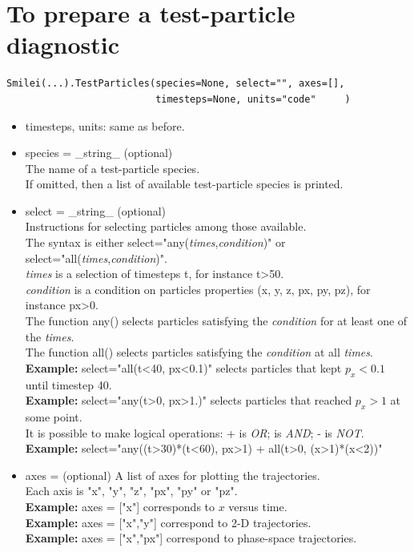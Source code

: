 \documentclass[11pt]{article}
\newcommand{\code}[1]{\colorbox{yellow!15}{\ttfamily #1}}
\newcommand{\val}[1]{{\ttfamily \textit{#1}}}
\begin{document}
\section{To prepare a test-particle diagnostic}

\begin{lstlisting}
Smilei(...).TestParticles(species=None, select="", axes=[],
                          timesteps=None, units="code"     )
\end{lstlisting}


\begin{itemize}
\item \code{timesteps}, \code{units}: same as before.
\item \code{species} = \code{\_string\_} (optional)\\
	The name of a test-particle species.\\
	If omitted, then a list of available test-particle species is printed.
\item \code{select} = \code{\_string\_} (optional)\\
	Instructions for selecting particles among those available.\\
	The syntax is either \code{select="any(\val{times},\val{condition})"}
	or \code{select="all(\val{times},\val{condition})"}.\\
	\val{times} is a selection of timesteps \code{t}, for instance \code{t>50}.\\
	\val{condition} is a condition on particles properties  (\code{x}, \code{y}, \code{z},
	\code{px}, \code{py}, \code{pz}), for instance \code{px>0}.\\
	The function \code{any()} selects particles satisfying the \val{condition} for at least one of the \val{times}.\\
	The function \code{all()} selects particles satisfying the \val{condition} at all \val{times}.\\
	\textbf{Example:} \code{select="all(t<40, px<0.1)"} selects particles that kept $p_x<0.1$ until timestep 40.\\
	\textbf{Example:} \code{select="any(t>0, px>1.)"} selects particles that reached $p_x>1$ at some point.\\
	It is possible to make logical operations: \code{+} is \emph{OR}; \code{*} is \emph{AND};
	 \code{-} is \emph{NOT}.\\
	\textbf{Example:} \code{select="any((t>30)*(t<60), px>1) + all(t>0, (x>1)*(x<2))"}
\item \code{axes} = \code{[\_string\_, \_string\_, ...]} (optional)
	A list of axes for plotting the trajectories.\\
	Each axis is \code{"x"}, \code{"y"}, \code{"z"}, \code{"px"}, \code{"py"} or \code{"pz"}.\\
	\textbf{Example:} \code{axes = ["x"]} corresponds to $x$ versus time. \\
	\textbf{Example:} \code{axes = ["x","y"]} correspond to 2-D trajectories. \\
	\textbf{Example:} \code{axes = ["x","px"]} correspond to phase-space trajectories.\\ 
\end{itemize}
\vspace{0.5cm}
\end{document}
